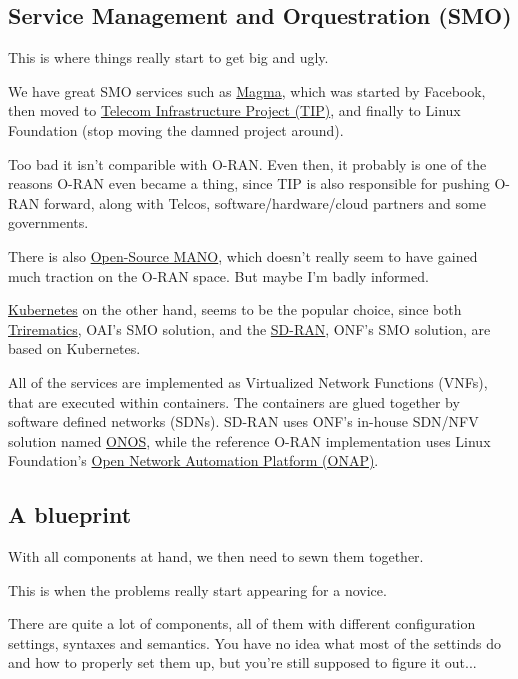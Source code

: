 \documentclass{article}
\begin{document}
    \subsection{Service Management and Orquestration (SMO)}
        This is where things really start to get big and ugly.

        We have great SMO services such as \href{https://magmacore.org/}{Magma},
        which was started by Facebook, then moved to
        \href{https://telecominfraproject.com/}{Telecom Infrastructure Project (TIP)},
        and finally to Linux Foundation (stop moving the damned project around).

        Too bad it isn't comparible with O-RAN. Even then, it probably is one of the
        reasons O-RAN even became a thing, since TIP is also responsible for pushing
        O-RAN forward, along with Telcos, software/hardware/cloud partners and some governments.

        There is also \href{https://osm.etsi.org/}{Open-Source MANO}, which doesn't
        really seem to have gained much traction on the O-RAN space. But maybe I'm badly informed.

        \href{https://kubernetes.io/}{Kubernetes} on the other hand, seems to be the
        popular choice, since both \href{https://openairinterface.org/mosaic5g/}{Trirematics},
        OAI's SMO solution, and the \href{https://opennetworking.org/open-ran/}{SD-RAN},
        ONF's SMO solution, are based on Kubernetes.

        All of the services are implemented as Virtualized Network Functions (VNFs),
        that are executed within containers. The containers are glued together by
        software defined networks (SDNs). SD-RAN uses ONF's in-house SDN/NFV solution
        named \href{https://opennetworking.org/onos/}{ONOS}, while the reference
        O-RAN implementation uses Linux Foundation's
        \href{https://www.onap.org/}{Open Network Automation Platform (ONAP)}.

    \subsection{A blueprint}
        With all components at hand, we then need to sewn them together.

        This is when the problems really start appearing for a novice.

        There are quite a lot of components, all of them with different
        configuration settings, syntaxes and semantics. You have no idea
        what most of the settinds do and how to properly set them up, but
        you're still supposed to figure it out...
\end{document}
